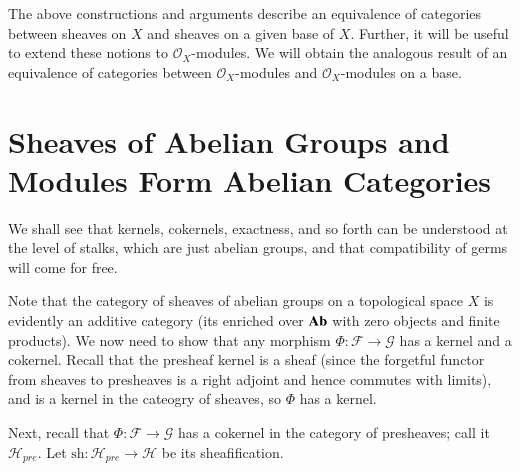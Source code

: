 The above constructions and arguments describe an equivalence of categories between sheaves on $X$ and sheaves on a given base of $X$. Further, it will be useful to extend these notions to $\mathscr{O}_X$-modules. We will obtain the analogous result of an equivalence of categories between $\mathscr{O}_X$-modules and $\mathscr{O}_X$-modules on a base.

\section{Sheaves of Abelian Groups and Modules Form Abelian Categories}

We shall see that kernels, cokernels, exactness, and so forth can be understood at the level of stalks, which are just abelian groups, and that compatibility of germs will come for free.

Note that the category of sheaves of abelian groups on a topological space $X$ is evidently an additive category (its enriched over $\normalfont\textbf{Ab}$ with zero objects and finite products). We now need to show that any morphism $\Phi:\mathscr{F}\rightarrow \mathscr{G}$ has a kernel and a cokernel. Recall that the presheaf kernel is a sheaf (since the forgetful functor from sheaves to presheaves is a right adjoint and hence commutes with limits), and is a kernel in the cateogry of sheaves, so $\Phi$ has a kernel.

Next, recall that $\Phi:\mathscr{F}\rightarrow \mathscr{G}$ has a cokernel in the category of presheaves; call it $\mathscr{H}_{pre}$. Let $\text{sh}:\mathscr{H}_{pre}\rightarrow \mathscr{H}$ be its sheafification. 

